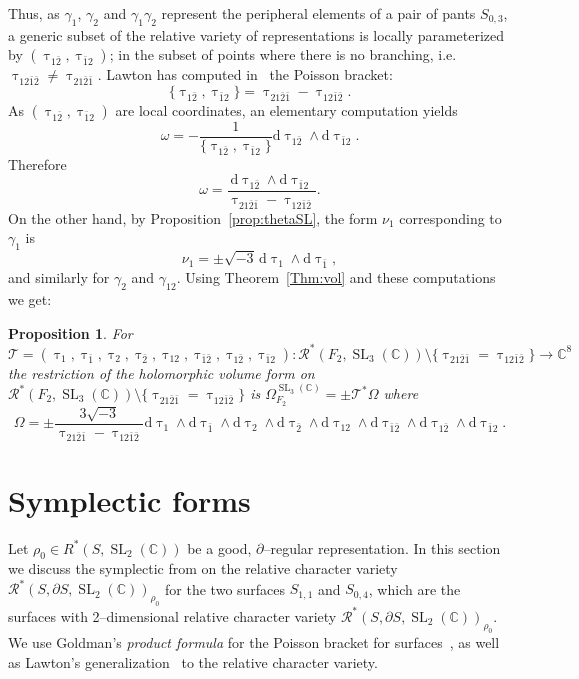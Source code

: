 \documentclass[11pt]{article}
\newtheorem{prop}[theo]{Proposition}
\theoremstyle{definition}
\numberwithin{equation}{section}
\numberwithin{figure}{section}
\numberwithin{table}{section}
\DeclareMathOperator{\SL}{SL}
\newcommand{\Rcal}{\mathcal{R}}
\newcommand{\Tcal}{\mathcal{T}}
\newcommand{\Cbb}{\mathbb{C}}
\newcommand*{\dd}{\mathrm{d}}
\begin{document}
Thus, as $\gamma_1$, $\gamma_2$ and $\gamma_{1}\gamma_2$ represent the peripheral elements of a pair of pants $S_{0,3}$, a generic subset of the relative variety of representations is locally parameterized by $(\uptau_{1\bar 2}, \uptau_{\bar 1 2})$; in the subset of points where there is no branching, i.e.~$\uptau_ {12\bar1\bar2} \neq \uptau_{21\bar 2\bar 1}$. Lawton has computed in~\cite[Theorem.~25]{LawtonP} the Poisson bracket:
\[
\{\uptau_{1\bar 2}, \uptau_{\bar 1 2} \}= \uptau_{21\bar 2\bar 1}-\uptau_{12\bar1\bar2}.
\]
As $(\uptau_{1\bar 2}, \uptau_{\bar 1 2})$ are local coordinates, an elementary computation yields
\begin{equation}\label{eqn:poisson}
\omega=-\frac{1}{ \{\uptau_{1\bar 2}, \uptau_{\bar 1 2} \} } \dd \uptau_{1\bar 2}\wedge \dd \uptau_{\bar 1 2}.
\end{equation}
Therefore
\begin{equation}\label{eqn:symplecticSL3}
\omega= \frac{\dd \uptau_{1\bar 2}\wedge \dd \uptau_{\bar 1 2} }{ \uptau_{21\bar2\bar1}-\uptau_{12\bar1\bar2}}.
\end{equation}
On the other hand, by Proposition~\ref{prop:thetaSL}, the form $\nu_1$ corresponding to $\gamma_1$ is
\[
\nu_1=\pm\sqrt{-3} \, \dd \uptau_1\wedge \dd \uptau_{\bar 1},
\]
and similarly for $\gamma_2$ and $\gamma_{12}$. Using Theorem~\ref{Thm:vol} and these computations we get:

\begin{prop}\label{Prop:volF2SL3}
For
\[
\Tcal=(\uptau_1,\uptau_{\bar 1},\uptau_2,\uptau_{\bar 2},\uptau_{12},\uptau_{\bar 1\bar 2},\uptau_{1\bar 2}, \uptau_{\bar 12})
\colon \Rcal^*(F_2,\SL_3(\Cbb))\setminus
\{ \uptau_{21\bar2\bar1} = \uptau_{12\bar1\bar2}\}\to \Cbb^8
\]
the restriction of the holomorphic volume form on $\Rcal^*(F_2,\SL_3(\Cbb))\setminus
\{ \uptau_{21\bar2\bar1} = \uptau_{12\bar1\bar2}\}$ is $ \Omega_{F_2}^{\SL_3(\Cbb) }= \pm \Tcal^*\Omega$ where
\[
\Omega=\pm \frac{3\sqrt{-3}}{ \uptau_{21\bar2\bar1}-\uptau_{12\bar1\bar2}} \dd \uptau_1\wedge \dd \uptau_{\bar 1} \wedge \dd \uptau_2\wedge \dd \uptau_{\bar 2}
\wedge \dd \uptau_{12}\wedge \dd \uptau_{\bar 1\bar 2}\wedge \dd \uptau_{1\bar 2}\wedge \dd \uptau_{\bar 1 2}.
\]
\end{prop}


\section{Symplectic forms}\label{Section:symplectic}

Let $\rho_0 \in R^*(S, \SL_2(\Cbb))$ be a good, $\partial$--regular representation. In this section we discuss the symplectic from on the relative character variety $\Rcal^*(S,\partial S, \SL_2(\Cbb))_{\rho_0}$ for the two surfaces $S_{1,1}$ and $S_{0,4}$, which are the surfaces with 2--dimensional relative character variety $\Rcal^*(S,\partial S, \SL_2(\Cbb))_{\rho_0}$. We use Goldman's \emph{product formula} for the Poisson bracket for surfaces~\cite{GoldmanHamiltonian}, as well as Lawton's generalization~\cite[Section~4]{LawtonP} to the relative character variety.
\end{document}
